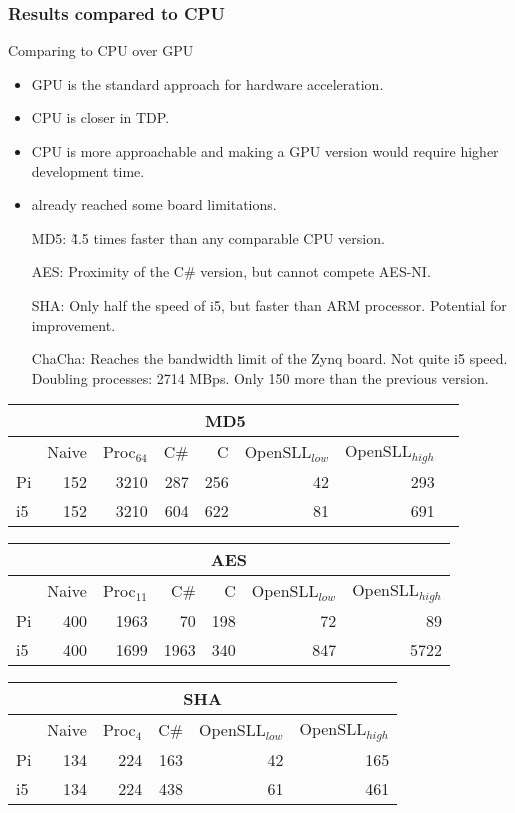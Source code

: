 \begin{frame}
  \frametitle{Results compared to CPU}
  \fontsize{4pt}{6}\selectfont
\begin{minipage}[b]{0.4\textwidth}
  \begin{tiny}
  Comparing to CPU over GPU
  \begin{itemize}
    \item GPU is the standard approach for hardware acceleration.
    \item CPU is closer in TDP. %
    \item CPU is more approachable and making a GPU version would require higher development time.
    \item already reached some board limitations.
  \end{itemize}
  \begin{itemize}
    \item[MD5:] \~4.5 times faster than any comparable CPU version.
    \item[AES:] Proximity of the C\# version, but cannot compete AES-NI.
    \item[SHA:] Only half the speed of i5, but faster than ARM processor. Potential for improvement.
    \item[ChaCha:] Reaches the bandwidth limit of the Zynq board. Not quite i5 speed. Doubling processes: 2714 MBps. Only 150 more than the previous version.
  \end{itemize}
  \end{tiny}
\end{minipage}
\qquad
\begin{minipage}[b]{0.55\textwidth}
\begin{tabular}{l r r r r r r r}
\multicolumn{7}{c}{MD5}\\
\hline
 & Naive & Proc$_{64}$ & C\# & C & OpenSLL$_{low}$ & OpenSLL$_{high}$\\
\hline
Pi & 152 & 3210 & 287 & 256 & 42 & 293\\
i5 & 152 & 3210 & 604 & 622 & 81 & 691
\end{tabular}

\begin{tabular}{l r r r r r r}
\multicolumn{7}{c}{AES}\\
\hline
 & Naive & Proc$_{11}$ & C\# & C & OpenSLL$_{low}$ & OpenSLL$_{high}$\\
\hline
Pi & 400 & 1963 &    70& 198 & 72  & 89\\
  i5 & 400 & 1699 & 1963& 340 & 847 & 5722
\end{tabular}
\begin{tabular}{l r r r r r}
\multicolumn{6}{c}{SHA}\\
\hline
 & Naive & Proc$_{4}$ & C\# & OpenSLL$_{low}$ & OpenSLL$_{high}$\\
\hline
Pi & 134 & 224 & 163 & 42 & 165\\
i5 & 134 & 224 & 438 & 61 & 461
\end{tabular}


\end{minipage}
\end{frame}
